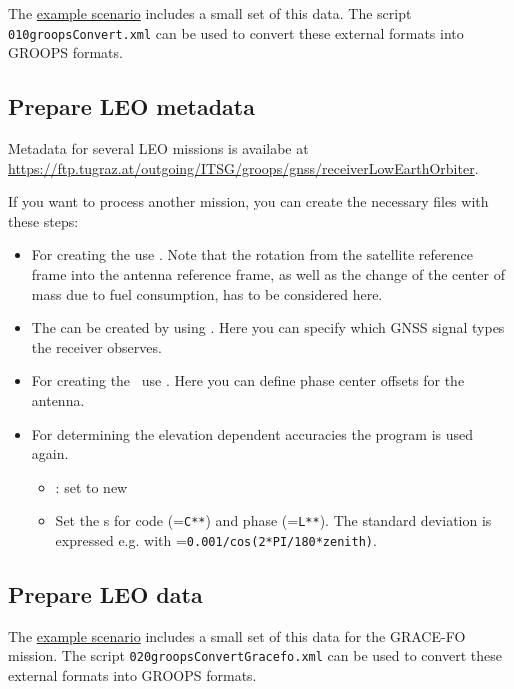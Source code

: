 The \href{https://ftp.tugraz.at/outgoing/ITSG/groops/scenario/scenarioLeoKinematicOrbit.zip}{example scenario} includes a small set of this data.
The script \verb|010groopsConvert.xml| can be used to convert these external formats into GROOPS formats.

\subsection{Prepare LEO metadata}\label{cookbook.kinematicOrbit:leoMetadata}
Metadata for several LEO missions is availabe at \url{https://ftp.tugraz.at/outgoing/ITSG/groops/gnss/receiverLowEarthOrbiter}.

If you want to process another mission, you can create the necessary files with these steps:
\begin{itemize}
  \item For creating the  use . Note that the rotation from the
  satellite reference frame into the antenna reference frame, as well as the change of the center of mass due to fuel consumption, has to be considered here.
  \item The  can be created by using . Here you can specify which GNSS signal types the receiver observes.
  \item For creating the \ use . Here you can define phase center offsets for the antenna.
  \item For determining the elevation dependent accuracies the program  is used again.
  \begin{itemize}
    \item {}: set to new
    \item Set the s for code (=\verb|C**|) and phase
    (=\verb|L**|). The standard deviation is expressed e.g. with =\verb|0.001/cos(2*PI/180*zenith)|.
  \end{itemize}
\end{itemize}

\subsection{Prepare LEO data}\label{cookbook.kinematicOrbit:leoData}
The \href{https://ftp.tugraz.at/outgoing/ITSG/groops/scenario/scenarioLeoKinematicOrbit.zip}{example scenario} includes a small set of this data for the GRACE-FO mission.
The script \verb|020groopsConvertGracefo.xml| can be used to convert these external formats into GROOPS formats.

